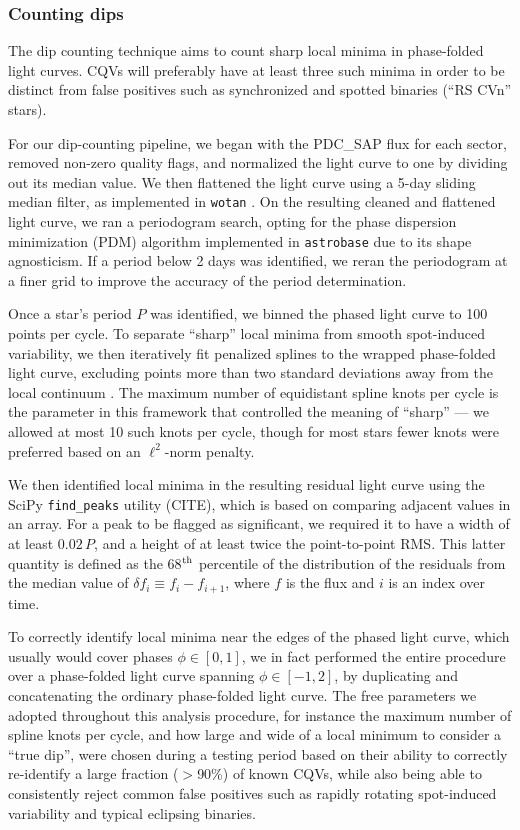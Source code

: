 \documentclass[11pt,twocolumn,tighten]{aastex63}
\begin{document}
\subsubsection{Counting dips}
\label{subsec:counting}

The dip counting technique aims to count sharp local minima in
phase-folded light curves.  CQVs will preferably have at least three
such minima in order to be distinct from false positives such as
synchronized and spotted binaries (``RS CVn'' stars). 

For our dip-counting pipeline, we began with the PDC\_SAP flux for
each sector, removed non-zero quality flags, and normalized the light
curve to one by dividing out its median value.  We then flattened the
light curve using a 5-day sliding median filter, as implemented in
\texttt{wotan} \citep{2019AJ....158..143H}.  On the resulting cleaned
and flattened light curve, we ran a periodogram search, opting for the
\citet{1978ApJ...224..953S} phase dispersion minimization (PDM)
algorithm implemented in \texttt{astrobase}
\citep{2021zndo...1011188B} due to its shape agnosticism.  If a period
below 2 days was identified, we reran the periodogram at a finer grid
to improve the accuracy of the period determination.

Once a star's period $P$ was identified, we binned the phased light
curve to 100 points per cycle.  To separate ``sharp'' local minima
from smooth spot-induced variability, we then iteratively fit
penalized splines to the wrapped phase-folded light curve, excluding
points more than two standard deviations away from the local continuum
\citep{2019AJ....158..143H}.  The maximum number of equidistant spline
knots per cycle is the parameter in this framework that controlled the
meaning of ``sharp'' --- we allowed at most 10 such knots per cycle,
though for most stars fewer knots were preferred based on an
$\ell^2$-norm penalty. 

We then identified local minima in the resulting residual light curve
using the SciPy \texttt{find\_peaks} utility (CITE), which is based on
comparing adjacent values in an array.  For a peak to be flagged as
significant, we required it to have a width of at least $0.02\,P$, and
a height of at least twice the point-to-point RMS.  This latter
quantity is defined as the 68$^{\rm th}$ percentile of the
distribution of the residuals from the median value of $\delta f_i
\equiv f_i - f_{i+1}$, where $f$ is the flux and $i$ is an index over
time.

To correctly identify local minima near the edges of the phased light
curve, which usually would cover phases $\phi \in [ 0,1 ]$, we in fact
performed the entire procedure over a phase-folded light curve
spanning $\phi \in [-1,2 ]$, by duplicating and concatenating the
ordinary phase-folded light curve.  The free parameters we adopted
throughout this analysis procedure, for instance the maximum number of
spline knots per cycle, and how large and wide of a local minimum to
consider a ``true dip'', were chosen during a testing period based on
their ability to correctly re-identify a large fraction ($>$90\%) of
known CQVs, while also being able to consistently reject common false
positives such as rapidly rotating spot-induced variability and
typical eclipsing binaries.
\end{document}

